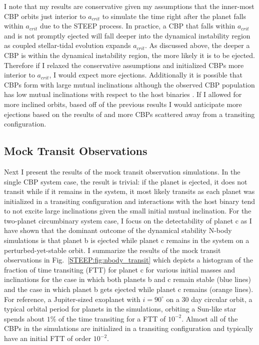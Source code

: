 I note that my results are conservative given my assumptions that the inner-most CBP orbits just interior to $a_{crit}$ to simulate the time right after the planet falls within $a_{crit}$ due to the STEEP process. In practice, a CBP that falls within $a_{crit}$ and is not promptly ejected will fall deeper into the dynamical instability region as coupled stellar-tidal evolution expands $a_{crit}$.  As discussed above, the deeper a CBP is within the dynamical instability region, the more likely it is to be ejected.  Therefore if I relaxed the conservative assumptions and initialized CBPs more interior to $a_{crit}$, I would expect more ejections.  Additionally it is possible that CBPs form with large mutual inclinations although the observed CBP population has low mutual inclinations with respect to the host binaries \citep{Li2016}.  If I allowed for more inclined orbits, based off of the previous results I would anticipate more ejections based on the results of \citet{Chatterjee2008} and more CBPs scattered away from a transiting configuration.  

\subsection{Mock Transit Observations} \label{STEEP:sec:nbody_observation}

Next I present the results of the mock transit observation simulations.  In the single CBP system case, the result is trivial: if the planet is ejected, it does not transit while if it remains in the system, it most likely transits as each planet was initialized in a transiting configuration and interactions with the host binary tend to not excite large inclinations given the small initial mutual inclination.  For the two-planet circumbinary system case, I focus on the detectability of planet c as I have shown that the dominant outcome of the dynamical stability N-body simulations is that planet b is ejected while planet c remains in the system on a perturbed-yet-stable orbit.  I summarize the results of the mock transit observations in Fig.~\ref{STEEP:fig:nbody_transit} which depicts a histogram of the fraction of time transiting (FTT) for planet c for various initial masses and inclinations for the case in which both planets b and c remain stable (blue lines) and the case in which planet b gets ejected while planet c remains (orange lines).  For reference, a Jupiter-sized exoplanet with $i=90^{\circ}$ on a 30 day circular orbit, a typical orbital period for planets in the simulations, orbiting a Sun-like star spends about $1\%$ of the time transiting for a FTT of $10^{-2}$.  Almost all of the CBPs in the simulations are initialized in a transiting configuration and typically have an initial FTT of order $10^{-2}$.  

